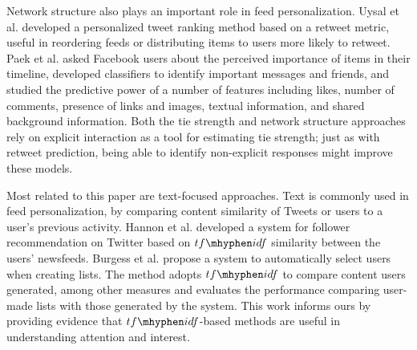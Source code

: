 Network structure also plays an important role in feed personalization.  
Uysal et al. \cite{Uysal2011} developed a personalized tweet ranking method based on a retweet metric, useful in reordering feeds or distributing items to users more likely to retweet. 
Paek et al. \cite{Paek2010} asked Facebook users about the perceived importance of items in their timeline, developed classifiers to identify important messages and friends, and studied the predictive power of a number of features including likes, number of comments, presence of links and images, textual information, and shared background information. 
Both the tie strength and network structure approaches rely on explicit interaction as a tool for estimating tie strength; just as with retweet prediction, being able to identify non-explicit responses might improve these models.

Most related to this paper are text-focused approaches.  Text is commonly used in feed personalization, by comparing content similarity of Tweets or users to a user's previous activity.  
Hannon et al. \cite{Hannon2011} developed a system for follower recommendation on Twitter based on $tf\mhyphen idf$ similarity between the users' newsfeeds. 
Burgess et al. \cite{Burgess2013} propose a system to automatically select users when creating lists. The method adopts $tf\mhyphen idf$ to compare content users generated, among other measures and evaluates the performance comparing user-made lists with those generated by the system.  This work informs ours by providing evidence that $tf\mhyphen idf$-based methods are useful in understanding attention and interest.

